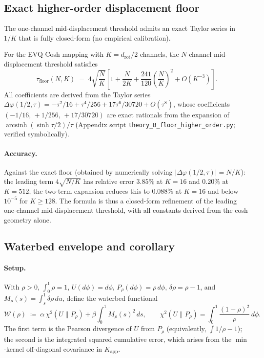 \subsection{Exact higher-order displacement floor}
\label{sec:floor-higher-order}

The one-channel mid-displacement threshold admits an exact Taylor series in $1/K$ that is fully closed-form (no empirical calibration).

\begin{proposition}
\label{prop:floor-higher-order}
For the EVQ-Cosh mapping with $K = d_{\mathrm{rot}}/2$ channels, the $N$-channel mid-displacement threshold satisfies
\begin{equation}
\tau_{\mathrm{floor}}(N, K) \;=\; 4\sqrt{\frac{N}{K}}\left[1 + \frac{N}{2K} + \frac{241}{120}\left(\frac{N}{K}\right)^{\!2} + O(K^{-3})\right].
\end{equation}
All coefficients are derived from the Taylor series
\(\Delta\varphi(1/2, \tau) = -\tau^2/16 + \tau^4/256 + 17\tau^6/30720 + O(\tau^8)\),
whose coefficients $(-1/16,\, +1/256,\, +17/30720)$ are exact rationals from the expansion of $\operatorname{arcsinh}(\sinh\tau/2)/\tau$ (Appendix script \texttt{theory\_B\_floor\_higher\_order.py}; verified symbolically).
\end{proposition}

\paragraph{Accuracy.} Against the exact floor (obtained by numerically solving $|\Delta\varphi(1/2, \tau)| = N/K$): the leading term $4\sqrt{N/K}$ has relative error $3.85\%$ at $K{=}16$ and $0.20\%$ at $K{=}512$; the two-term expansion reduces this to $0.088\%$ at $K{=}16$ and below $10^{-5}$ for $K{\geq}128$. The formula is thus a closed-form refinement of the leading one-channel mid-displacement threshold, with all constants derived from the cosh geometry alone.

\subsection{Waterbed envelope and corollary}
\label{sec:waterbed-proof}

\paragraph{Setup.} With $\rho{>}0$, $\int_0^1\rho{=}1$, $U(d\phi){=}d\phi$, $P_\rho(d\phi){=}\rho\,d\phi$, $\delta\rho{=}\rho{-}1$, and $M_\rho(s){=}\int_s^1\delta\rho\,du$, define the waterbed functional
\begin{equation}
\mathcal{W}(\rho) \;\coloneqq\; \alpha\,\chi^2(U\|P_\rho) + \beta\int_0^1 M_\rho(s)^2\,ds,\qquad \chi^2(U\|P_\rho) = \int_0^1 \frac{(1-\rho)^2}{\rho}\,d\phi.
\label{eq:waterbed-functional}
\end{equation}
The first term is the Pearson divergence of $U$ from $P_\rho$ (equivalently, $\int 1/\rho - 1$); the second is the integrated squared cumulative error, which arises from the $\min$-kernel off-diagonal covariance in $K_{\mathrm{app}}$.

